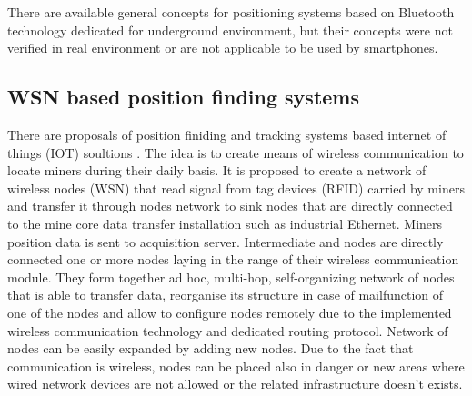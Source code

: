 \documentclass[../main.tex]{subfiles}
\begin{document}
There are available general concepts for positioning systems based on Bluetooth technology dedicated for underground environment\cite{article_inertial_active_beacons_calculus_kalman}\cite{positioning_tests}\cite{thesis_tablet_positioning}, but their concepts were not verified in real environment or are not applicable to be used by smartphones.



\subsection{WSN based position finding systems} %
\label{sub:wsn_based_position_finding_systems}

There are proposals of position finiding and tracking systems based internet of things (IOT) soultions \cite{WSN_tracking, WSN_monitoring}. The idea is to create means of wireless communication to locate miners during their daily basis. It is proposed to create a network of wireless nodes (WSN) that read signal from tag devices (RFID) carried by miners and transfer it through nodes network to sink nodes that are directly connected to the mine core data transfer installation such as industrial Ethernet. Miners position data is sent to acquisition server. Intermediate and nodes are directly connected one or more nodes laying in the range of their wireless communication module. They form together ad hoc, multi-hop, self-organizing network of nodes that is able to transfer data, reorganise its structure in case of mailfunction of one of the nodes and allow to configure nodes remotely due to the implemented wireless communication technology and dedicated routing protocol. Network of nodes can be easily expanded by adding new nodes. Due to the fact that communication is wireless, nodes can be placed also in danger or new areas where wired network devices are not allowed or the related infrastructure doesn't exists.
\end{document}
